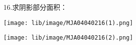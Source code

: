 16.求阴影部分面积：

\begin{center}

    \texttt{[image: lib/image/MJA04040216(1).png]}\qquad\qquad\qquad

    \texttt{[image: lib/image/MJA04040216(2).png]}

\end{center}



